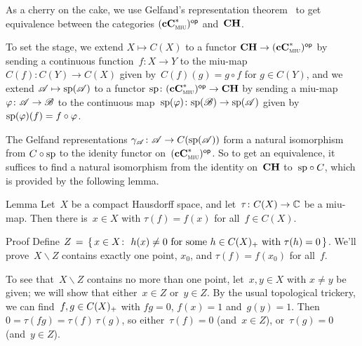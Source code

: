 \documentclass[a]{subfiles}
\begin{document}
\begin{parsec}%
\begin{point}%
As a cherry on the cake,
we use Gelfand's representation theorem~
to get equivalence between the categories ${(\mathbf{cC}^*_{\text{\textsc{miu}}})}{^{\mathsf{op}}}$
and~$\mathbf{CH}$.

To set the stage,
we extend $X\mapsto C(X)$ to a functor
$\mathbf{CH}\to {(\mathbf{cC}^*_{\text{\textsc{miu}}})}{^{\mathsf{op}}}$
by sending a continuous function~$f\colon X\to Y$
to the miu-map $C(f)\colon C(Y)\to C(X)$
given by~$C(f)(g)=g\circ f$ for $g\in C(Y)$,
and we extend $\mathscr{A}\mapsto \mathrm{sp}(\mathscr{A})$
to a functor $\mathrm{sp}\colon {(\mathbf{cC}^*_{\text{\textsc{miu}}})}{^{\mathsf{op}}}\to \mathbf{CH}$
by sending a miu-map $\varphi \colon \mathscr{A}\to\mathscr{B}$
to the continuous map~$\mathrm{sp}(\varphi)\colon \mathrm{sp}(\mathscr{B})\to\mathrm{sp}(\mathscr{A})$
given by~$\mathrm{sp}(\varphi)(f)=f\circ \varphi$.

The Gelfand representations $\gamma_{\mathscr{A}}\colon \mathscr{A}\to C(\mathrm{sp}(\mathscr{A}))$
form a natural isomorphism
from $C\circ \mathrm{sp}$ to the idenity functor on~${(\mathbf{cC}^*_{\text{\textsc{miu}}})}{^{\mathsf{op}}}$.
So to get an equivalence,
it suffices to find a natural isomorphism
from the identity on~$\mathbf{CH}$ to~$\mathrm{sp}\circ C$,
which is provided by the following lemma.
\end{point}
\begin{point}{Lemma}%
Let~$X$ be a compact Hausdorff space,
and let~$\tau \colon C(X)\to \mathbb{C}$ be a miu-map.
Then there is~$x\in X$ with $\tau(f)=f (x)$
for all~$f\in C(X)$.
\begin{point}{Proof}%
Define
$Z\,= \, \{\,x\in X\colon \ h(x)\neq 0\text{ for some~$h\in C(X)_{+}$
with $\tau(h)=0$}\,\}$.
We'll prove~$X\backslash Z$ contains
exactly one point, $x_0$, and $\tau(f)=f(x_0)$ for all~$f$.
\begin{point}%
To see that~$X\backslash Z$ contains no more than one point,
let~$x,y\in X$ with $x\neq y$ be given;
we will show that either~$x\in Z$ or~$y\in Z$.
By the usual topological trickery,
we can find~$f,g\in C(X)_{+}$
with $fg=0$, $f(x)=1$ and~$g(y)=1$.
Then~$0=\tau(fg)=\tau(f)\,\tau(g)$,
so either~$\tau(f)=0$ (and~$x\in Z$), or~$\tau(g)=0$
(and~$y\in Z$).


\end{point}
\end{point}
\end{point}
\end{parsec}
\end{document}
